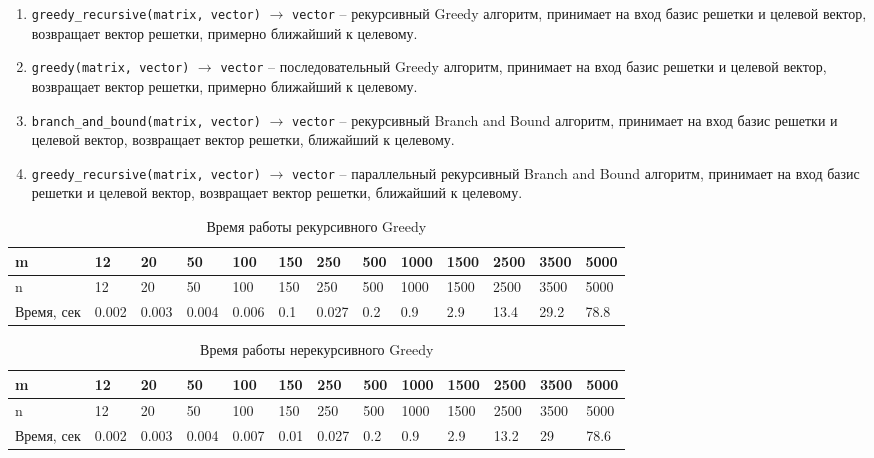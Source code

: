 \begin{enumerate}

\item \verb!greedy_recursive(matrix, vector)! $ \rightarrow $ \verb!vector! -- рекурсивный Greedy алгоритм, принимает на вход базис решетки и целевой вектор, возвращает вектор решетки, примерно ближайший к целевому.

\item \verb!greedy(matrix, vector)! $ \rightarrow $ \verb!vector! -- последовательный Greedy алгоритм, принимает на вход базис решетки и целевой вектор, возвращает вектор решетки, примерно ближайший к целевому.

\item \verb!branch_and_bound(matrix, vector)! $ \rightarrow $ \verb!vector! -- рекурсивный Branch and Bound алгоритм, принимает на вход базис решетки и целевой вектор, возвращает вектор решетки, ближайший к целевому.

\item \verb!greedy_recursive(matrix, vector)! $ \rightarrow $ \verb!vector! -- параллельный рекурсивный Branch and Bound алгоритм, принимает на вход базис решетки и целевой вектор, возвращает вектор решетки, ближайший к целевому.

\end{enumerate}


\begin{table}[H]
  \caption{Время работы рекурсивного Greedy}
  \centering
  \begin{tabular}{ | l | l | l | l | l | l | l | l | l | l | l | l | l | }
  \hline
  m & 12 & 20 & 50 & 100 & 150 & 250 & 500 & 1000 & 1500 & 2500 & 3500 & 5000 \\ \hline
  n & 12 & 20 & 50 & 100 & 150 & 250 & 500 & 1000 & 1500 & 2500 & 3500 & 5000 \\ \hline
  Время, сек & 0.002 & 0.003 & 0.004 & 0.006 & 0.1 & 0.027 & 0.2 & 0.9 & 2.9 & 13.4 & 29.2 & 78.8 \\ \hline
  \end{tabular}
  \label{table:Greedy_recursive}
\end{table}

\begin{table}[H]
  \caption{Время работы нерекурсивного Greedy}
  \centering
  \begin{tabular}{ | l | l | l | l | l | l | l | l | l | l | l | l | l | }
  \hline
  m & 12 & 20 & 50 & 100 & 150 & 250 & 500 & 1000 & 1500 & 2500 & 3500 & 5000 \\ \hline
  n & 12 & 20 & 50 & 100 & 150 & 250 & 500 & 1000 & 1500 & 2500 & 3500 & 5000 \\ \hline
  Время, сек & 0.002 & 0.003 & 0.004 & 0.007 & 0.01 & 0.027 & 0.2 & 0.9 & 2.9 & 13.2 & 29 & 78.6 \\ \hline
  \end{tabular}
  \label{table:Greedy}
\end{table}

